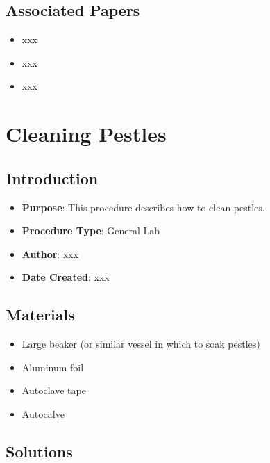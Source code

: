 \documentclass[
  letterpaper,
  DIV=11,
  numbers=noendperiod]{scrreprt}
\providecommand{\tightlist}{%
  \setlength{\itemsep}{0pt}\setlength{\parskip}{0pt}}\usepackage{longtable,booktabs,array}
\begin{document}
\hypertarget{associated-papers-1}{%
\section{Associated Papers}\label{associated-papers-1}}

\begin{itemize}
\tightlist
\item
  xxx
\item
  xxx
\item
  xxx
\end{itemize}

\hypertarget{sec-general-cleaning_pestles}{%
\chapter{Cleaning Pestles}\label{sec-general-cleaning_pestles}}

\hypertarget{introduction-2}{%
\section{Introduction}\label{introduction-2}}

\begin{itemize}
\tightlist
\item
  \textbf{Purpose}: This procedure describes how to clean pestles.
\item
  \textbf{Procedure Type}: General Lab
\item
  \textbf{Author}: xxx
\item
  \textbf{Date Created}: xxx
\end{itemize}

\hypertarget{materials-2}{%
\section{Materials}\label{materials-2}}

\begin{itemize}
\tightlist
\item
  Large beaker (or similar vessel in which to soak pestles)
\item
  Aluminum foil
\item
  Autoclave tape
\item
  Autocalve
\end{itemize}

\hypertarget{solutions-2}{%
\section{Solutions}\label{solutions-2}}
\end{document}

